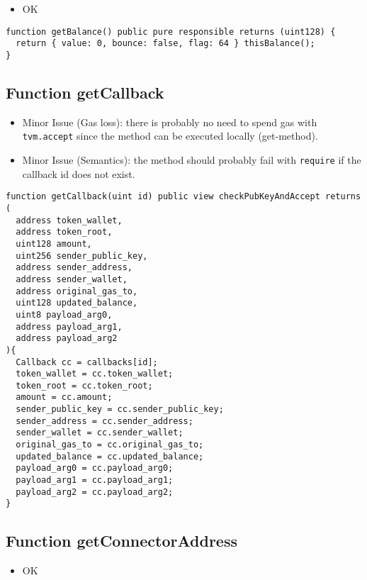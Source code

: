 \begin{itemize}
\item OK
\end{itemize}

\begin{lstlisting}[firstnumber=604]
function getBalance() public pure responsible returns (uint128) {
  return { value: 0, bounce: false, flag: 64 } thisBalance();
}
\end{lstlisting}

\subsection{Function getCallback}

\begin{itemize}
\item Minor Issue (Gas loss): there is probably no need to spend gas with {\tt
  tvm.accept} since the method can be executed locally (get-method).
\item Minor Issue (Semantics): the method should probably fail with
  {\tt require} if the callback id does not exist.
\end{itemize}

\begin{lstlisting}[firstnumber=571]
function getCallback(uint id) public view checkPubKeyAndAccept returns (
  address token_wallet,
  address token_root,
  uint128 amount,
  uint256 sender_public_key,
  address sender_address,
  address sender_wallet,
  address original_gas_to,
  uint128 updated_balance,
  uint8 payload_arg0,
  address payload_arg1,
  address payload_arg2
){
  Callback cc = callbacks[id];
  token_wallet = cc.token_wallet;
  token_root = cc.token_root;
  amount = cc.amount;
  sender_public_key = cc.sender_public_key;
  sender_address = cc.sender_address;
  sender_wallet = cc.sender_wallet;
  original_gas_to = cc.original_gas_to;
  updated_balance = cc.updated_balance;
  payload_arg0 = cc.payload_arg0;
  payload_arg1 = cc.payload_arg1;
  payload_arg2 = cc.payload_arg2;
}
\end{lstlisting}

\subsection{Function getConnectorAddress}

\begin{itemize}
\item OK
\end{itemize}


